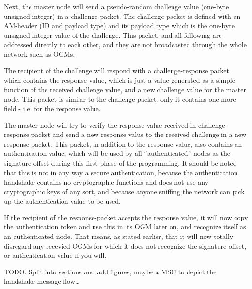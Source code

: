 Next, the master node will send a pseudo-random challenge value (one-byte
unsigned integer) in a challenge packet. The challenge packet is defined with an
\ac{AM}-header (ID and payload type) and its payload type which is the one-byte
unsigned integer value of the challenge. This packet, and all following are
addressed directly to each other, and they are not broadcasted through the whole
network such as \acp{OGM}.

The recipient of the challenge will respond with a challenge-response packet
which contains the response value, which is just a value generated as a simple
function of the received challenge value, and a new challenge value for the
master node. This packet is similar to the challenge packet, only it contains
one more field - i.e. for the response value.

The master node will try to verify the response value received in
challenge-response packet and send a new response value to the received
challenge in a new response-packet. This packet, in addition to the response
value, also contains an authentication value, which will be used by all
``authenticated'' nodes as the signature offset during this first phase of the
programming. It should be noted that this is not in any way a secure
authentication, because the authentication handshake contains no cryptographic
functions and does not use any cryptographic keys of any sort, and because
anyone sniffing the network can pick up the authentication value to be used.

If the recipient of the response-packet accepts the response value, it will now
copy the authentication token and use this in its \ac{OGM} later on, and
recognize itself as an authenticated node. That means, as stated earlier, that
it will now totally disregard any recevied \acp{OGM} for which it does not
recognize the signature offset, or authentication value if you will.

TODO: Split into sections and add figures, maybe a MSC to depict the handshake
message flow\ldots
